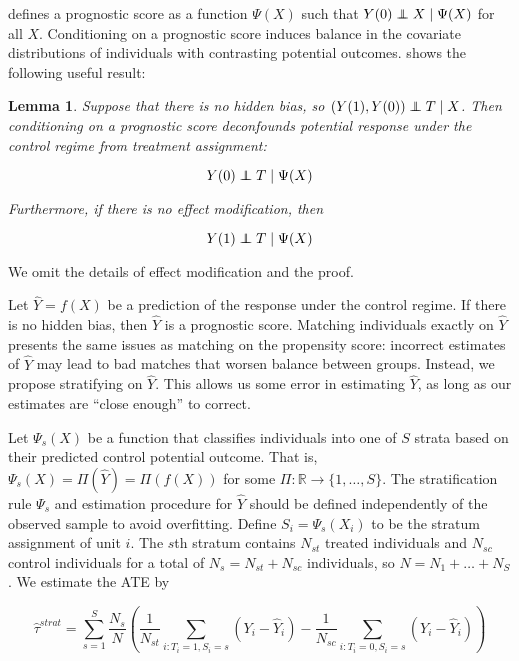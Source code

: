 \documentclass[12pt]{article}
\newtheorem{lemma}[theorem]{Lemma}
\newcommand{\reals}{\mathbb{R}}
\newcommand\independent{\protect\mathpalette{\protect\independenT}{\perp}}
\def\independenT#1#2{\mathrel{\rlap{$#1#2$}\mkern2mu{#1#2}}}
\begin{document}
\citet{hansen_prognostic_2008} defines a prognostic score as a function $\Psi(X)$ such that $Y(0) \independent X \mid \Psi(X)$ for all $X$.
Conditioning on a prognostic score induces balance in the covariate distributions of individuals with contrasting potential outcomes.
\citet{hansen_prognostic_2008} shows the following useful result:

\begin{lemma}
Suppose that there is no hidden bias, so $(Y(1), Y(0)) \independent T \mid X$. Then conditioning on a prognostic score deconfounds potential response under the control regime from treatment assignment:

$$Y(0) \independent T \mid \Psi(X)$$

\noindent Furthermore, if there is no effect modification, then

$$Y(1) \independent T \mid \Psi(X)$$

\end{lemma}

\noindent We omit the details of effect modification and the proof.


Let $\hat{Y} = f(X)$ be a prediction of the response under the control regime. 
If there is no hidden bias, then $\hat{Y}$ is a prognostic score.
Matching individuals exactly on $\hat{Y}$ presents the same issues as matching on the propensity score:
incorrect estimates of $\hat{Y}$ may lead to bad matches that worsen balance between groups.
Instead, we propose stratifying on $\hat{Y}$.
This allows us some error in estimating $\hat{Y}$, as long as our estimates are ``close enough'' to correct.


Let $\Psi_s(X)$ be a function that classifies individuals into one of $S$ strata based on their predicted control potential outcome.
That is, $\Psi_s(X) = \Pi(\hat{Y})  = \Pi(f(X))$ for some $\Pi: \reals \to \{1, \dots, S\}$.
The stratification rule $\Psi_s$ and estimation procedure for $\hat{Y}$ should be defined independently of the observed sample to avoid overfitting.
Define $S_i = \Psi_s(X_i)$ to be the stratum assignment of unit $i$.
The $s$th stratum contains $N_{st}$ treated individuals and $N_{sc}$ control individuals for a total of $N_s = N_{st}+N_{sc}$ individuals, so $N = N_1 + \dots + N_S$.
We estimate the ATE by


\begin{equation}\label{tau_hat}
\hat{\tau}^{strat} =  \sum_{s=1}^{S} \frac{N_s}{N}\left( \frac{1}{N_{st}} \sum_{i: T_i=1, S_i=s} (Y_i - \hat{Y}_i) - \frac{1}{N_{sc}} \sum_{i: T_i=0, S_i=s} (Y_i - \hat{Y}_i)\right)
\end{equation}
\end{document}
